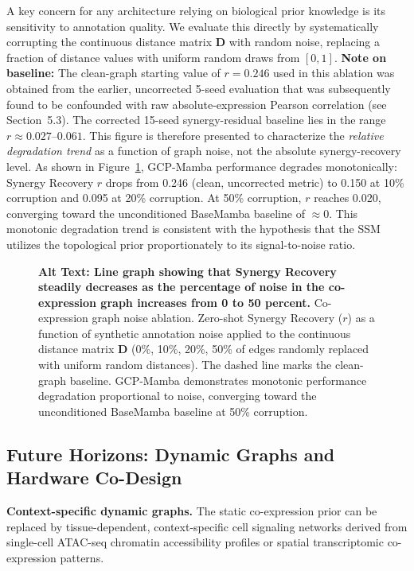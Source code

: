 \documentclass{bioinfo}
\begin{document}
A key concern for any architecture relying on biological prior knowledge is its sensitivity to annotation quality. We evaluate this directly by systematically corrupting the continuous distance matrix $\mathbf{D}$ with random noise, replacing a fraction of distance values with uniform random draws from $[0, 1]$. \textbf{Note on baseline:} The clean-graph starting value of $r = 0.246$ used in this ablation was obtained from the earlier, uncorrected 5-seed evaluation that was subsequently found to be confounded with raw absolute-expression Pearson correlation (see Section~5.3). The corrected 15-seed synergy-residual baseline lies in the range $r \approx 0.027$--$0.061$. This figure is therefore presented to characterize the \textit{relative degradation trend} as a function of graph noise, not the absolute synergy-recovery level. As shown in Figure~\ref{fig:noise}, GCP-Mamba performance degrades monotonically: Synergy Recovery $r$ drops from 0.246 (clean, uncorrected metric) to 0.150 at 10\% corruption and 0.095 at 20\% corruption. At 50\% corruption, $r$ reaches 0.020, converging toward the unconditioned BaseMamba baseline of $\approx 0$. This monotonic degradation trend is consistent with the hypothesis that the SSM utilizes the topological prior proportionately to its signal-to-noise ratio.

\begin{figure}[!htbp]
\centering
\caption{\textbf{Alt Text: Line graph showing that Synergy Recovery steadily decreases as the percentage of noise in the co-expression graph increases from 0 to 50 percent.} Co-expression graph noise ablation. Zero-shot Synergy Recovery ($r$) as a function of synthetic annotation noise applied to the continuous distance matrix $\mathbf{D}$ (0\%, 10\%, 20\%, 50\% of edges randomly replaced with uniform random distances). The dashed line marks the clean-graph baseline. GCP-Mamba demonstrates monotonic performance degradation proportional to noise, converging toward the unconditioned BaseMamba baseline at 50\% corruption.}
\label{fig:noise}
\end{figure}

\subsection{Future Horizons: Dynamic Graphs and Hardware Co-Design}

\textbf{Context-specific dynamic graphs.} The static co-expression prior can be replaced by tissue-dependent, context-specific cell signaling networks derived from single-cell ATAC-seq chromatin accessibility profiles or spatial transcriptomic co-expression patterns.
\end{document}
